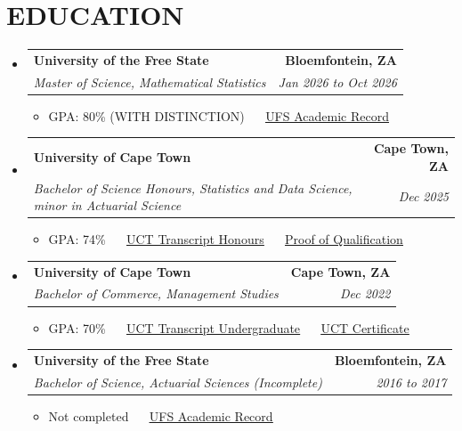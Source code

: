 \documentclass[letterpaper,11pt]{article}
\makeatletter
\newcommand{\resumeItem}[1]{
  \item\small{
    {#1 \vspace{-1pt}}
  }
}
\newcommand{\resumeSubheading}[4]{
  \vspace{-2pt}\item
    \begin{tabular*}{1.0\textwidth}[t]{l@{\extracolsep{\fill}}r}
      \textbf{\large#1} & \textbf{\small #2} \\
      \textit{\large#3} & \textit{\small #4} \\

    \end{tabular*}\vspace{-7pt}
}
\newcommand{\resumeSubHeadingListStart}{\begin{itemize}[leftmargin=0.0in, label={}]}
\newcommand{\resumeSubHeadingListEnd}{\end{itemize}}
\newcommand{\resumeItemListStart}{\begin{itemize}[leftmargin=0.1in]}
\newcommand{\resumeItemListEnd}{\end{itemize}\vspace{-5pt}}
\makeatother
\begin{document}
\section{EDUCATION}
\vspace{4pt}

\resumeSubHeadingListStart
    \resumeSubheading
      {University of the Free State}{Bloemfontein, ZA}
      {Master of Science, Mathematical Statistics}{Jan 2026 to Oct 2026}
      \resumeItemListStart
            \resumeItem{\normalsize{GPA: 80\% (WITH DISTINCTION) ~\textbar~ \href{https://github.com/thabangTheActuaryCoder/Academic-Records/blob/master/UV_ACADREC_S\%20\%28Baloyi\%20Thabang\%20MSc\%29.pdf}{\color{blue}\underline{UFS Academic Record}}}}
      \resumeItemListEnd

    \vspace{2pt}
    \resumeSubheading
      {University of Cape Town}{Cape Town, ZA}
      {Bachelor of Science Honours, Statistics and Data Science, minor in Actuarial Science}{Dec 2025}
      \resumeItemListStart
            \resumeItem{\normalsize{GPA: 74\% ~\textbar~ \href{https://github.com/thabangTheActuaryCoder/Academic-Records/blob/master/UCT\%20TRANSCRIPT\%202025.pdf}{\color{blue}\underline{UCT Transcript Honours}} ~\textbar~ \href{https://github.com/thabangTheActuaryCoder/Academic-Records/blob/master/Proof\%20of\%20Qualification\%20-\%20BSc.\%20Hons\%20Statistics\%20and\%20Data\%20Sciences.pdf}{\color{blue}\underline{Proof of Qualification}}}}
      \resumeItemListEnd
    \vspace{2pt}
    \resumeSubheading
      {University of Cape Town}{Cape Town, ZA}
      {Bachelor of Commerce, Management Studies}{Dec 2022}
      \resumeItemListStart
            \resumeItem{\normalsize{GPA: 70\%
            ~\textbar~
            \href{https://github.com/thabangTheActuaryCoder/Academic-Records/blob/master/UCT\%20TRANSCRIPT\%202025.pdf}{\color{blue}\underline{UCT Transcript Undergraduate}} ~\textbar~ \href{https://github.com/thabangTheActuaryCoder/Academic-Records/blob/master/UCT\%20CERTIFICATE.pdf}{\color{blue}\underline{UCT Certificate}}}}
      \resumeItemListEnd
    \vspace{2pt}
    \resumeSubheading
      {University of the Free State}{Bloemfontein, ZA}
      {Bachelor of Science, Actuarial Sciences \textup{(Incomplete)}}{2016 to 2017}
      \resumeItemListStart
            \resumeItem{\normalsize{Not completed ~\textbar~ \href{https://github.com/thabangTheActuaryCoder/Academic-Records/blob/master/UV\_ACADREC\_S\%202026.pdf}{\color{blue}\underline{UFS Academic Record}}}}
      \resumeItemListEnd
  \resumeSubHeadingListEnd
  \vspace{-4pt}
\end{document}
